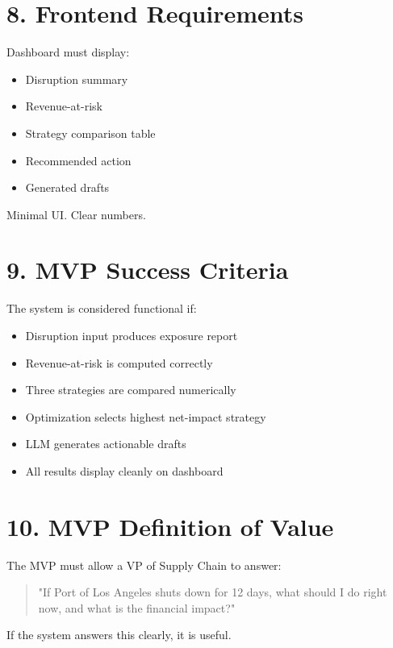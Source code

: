 \documentclass[11pt]{article}
\begin{document}
\section*{8. Frontend Requirements}

Dashboard must display:

\begin{itemize}
    \item Disruption summary
    \item Revenue-at-risk
    \item Strategy comparison table
    \item Recommended action
    \item Generated drafts
\end{itemize}

Minimal UI. Clear numbers.

\section*{9. MVP Success Criteria}

The system is considered functional if:

\begin{itemize}
    \item Disruption input produces exposure report
    \item Revenue-at-risk is computed correctly
    \item Three strategies are compared numerically
    \item Optimization selects highest net-impact strategy
    \item LLM generates actionable drafts
    \item All results display cleanly on dashboard
\end{itemize}

\section*{10. MVP Definition of Value}

The MVP must allow a VP of Supply Chain to answer:

\begin{quote}
"If Port of Los Angeles shuts down for 12 days,
what should I do right now,
and what is the financial impact?"
\end{quote}

If the system answers this clearly, it is useful.
\end{document}
